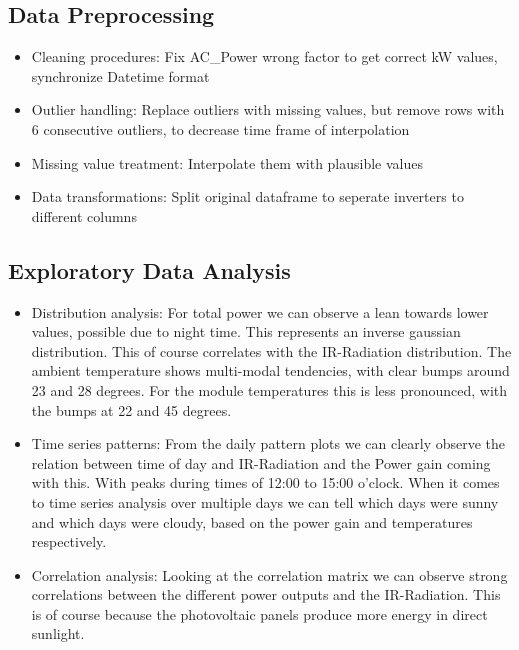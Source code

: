 \documentclass[10pt]{article}
\begin{document}
\subsection{Data Preprocessing}
\begin{itemize}
    \item Cleaning procedures: Fix AC\_Power wrong factor to get correct kW values, synchronize Datetime format 
    \item Outlier handling: Replace outliers with missing values, but remove rows with 6 consecutive outliers, to decrease time frame of interpolation
    \item Missing value treatment: Interpolate them with plausible values
    \item Data transformations: Split original dataframe to seperate inverters to different columns
\end{itemize}

\subsection{Exploratory Data Analysis}
\begin{itemize}
    \item Distribution analysis: For total power we can observe a lean towards lower values, possible due to night time. This represents an inverse gaussian distribution. This of course correlates with the IR-Radiation distribution. The ambient temperature shows multi-modal tendencies, with clear bumps around 23 and 28 degrees. For the module temperatures this is less pronounced, with the bumps at 22 and 45 degrees.
    \item Time series patterns: From the daily pattern plots we can clearly observe the relation between time of day and IR-Radiation and the Power gain coming with this. With peaks during times of 12:00 to 15:00 o'clock. When it comes to time series analysis over multiple days we can tell which days were sunny and which days were cloudy, based on the power gain and temperatures respectively.
    \item Correlation analysis: Looking at the correlation matrix we can observe strong correlations between the different power outputs and the IR-Radiation. This is of course because the photovoltaic panels produce more energy in direct sunlight.
\end{itemize}
\end{document}
